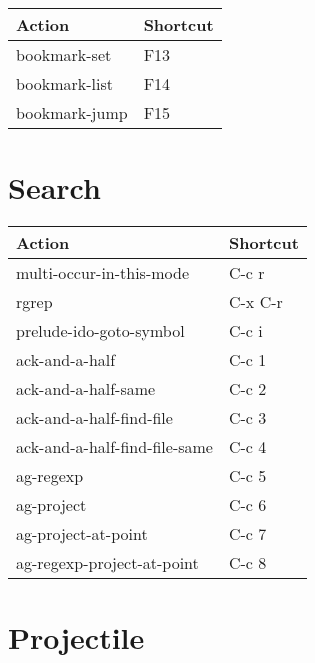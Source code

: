 \documentclass[english]{rcalibrionecolumn}
\begin{document}
\begin{center}
\begin{tabular}{ll}
 \textbf{Action}  &  \textbf{Shortcut}  \\
\hline
 bookmark-set     &  F13                \\
 bookmark-list    &  F14                \\
 bookmark-jump    &  F15                \\
\end{tabular}
\end{center}
\section{Search}
\label{sec-5}


\begin{center}
\begin{tabular}{ll}
 \textbf{Action}                &  \textbf{Shortcut}  \\
\hline
 multi-occur-in-this-mode       &  C-c r              \\
 rgrep                          &  C-x C-r            \\
 prelude-ido-goto-symbol        &  C-c i              \\
\hline
 ack-and-a-half                 &  C-c 1              \\
 ack-and-a-half-same            &  C-c 2              \\
 ack-and-a-half-find-file       &  C-c 3              \\
 ack-and-a-half-find-file-same  &  C-c 4              \\
\hline
 ag-regexp                      &  C-c 5              \\
 ag-project                     &  C-c 6              \\
 ag-project-at-point            &  C-c 7              \\
 ag-regexp-project-at-point     &  C-c 8              \\
\hline
\end{tabular}
\end{center}
\section{Projectile}
\label{sec-6}
\end{document}
